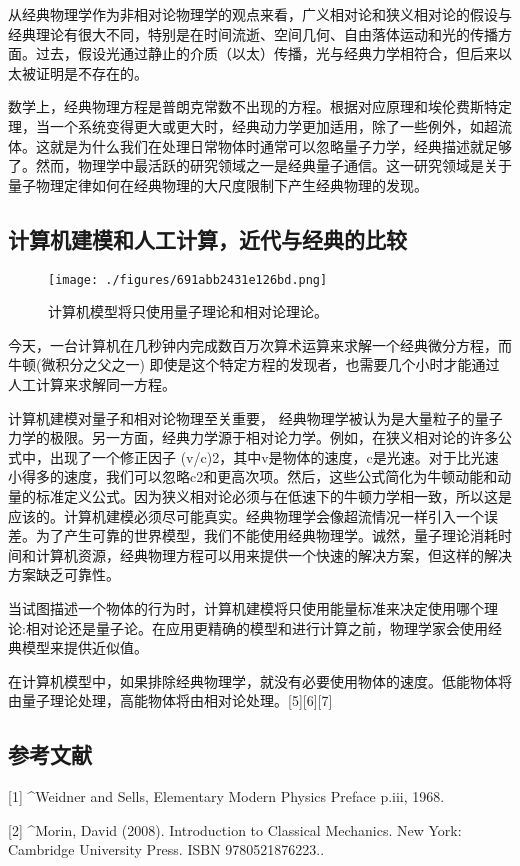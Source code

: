 从经典物理学作为非相对论物理学的观点来看，广义相对论和狭义相对论的假设与经典理论有很大不同，特别是在时间流逝、空间几何、自由落体运动和光的传播方面。过去，假设光通过静止的介质（以太）传播，光与经典力学相符合，但后来以太被证明是不存在的。

数学上，经典物理方程是普朗克常数不出现的方程。根据对应原理和埃伦费斯特定理，当一个系统变得更大或更大时，经典动力学更加适用，除了一些例外，如超流体。这就是为什么我们在处理日常物体时通常可以忽略量子力学，经典描述就足够了。然而，物理学中最活跃的研究领域之一是经典量子通信。这一研究领域是关于量子物理定律如何在经典物理的大尺度限制下产生经典物理的发现。
\subsection{计算机建模和人工计算，近代与经典的比较}
\begin{figure}[ht]
\centering
\texttt{[image: ./figures/691abb2431e126bd.png]}
\caption{计算机模型将只使用量子理论和相对论理论。} \label{fig_JDWLX_1}
\end{figure}
今天，一台计算机在几秒钟内完成数百万次算术运算来求解一个经典微分方程，而牛顿(微积分之父之一) 即使是这个特定方程的发现者，也需要几个小时才能通过人工计算来求解同一方程。

计算机建模对量子和相对论物理至关重要， 经典物理学被认为是大量粒子的量子力学的极限。另一方面，经典力学源于相对论力学。例如，在狭义相对论的许多公式中，出现了一个修正因子 (v/c)2，其中v是物体的速度，c是光速。对于比光速小得多的速度，我们可以忽略c2和更高次项。然后，这些公式简化为牛顿动能和动量的标准定义公式。因为狭义相对论必须与在低速下的牛顿力学相一致，所以这是应该的。计算机建模必须尽可能真实。经典物理学会像超流情况一样引入一个误差。为了产生可靠的世界模型，我们不能使用经典物理学。诚然，量子理论消耗时间和计算机资源，经典物理方程可以用来提供一个快速的解决方案，但这样的解决方案缺乏可靠性。

当试图描述一个物体的行为时，计算机建模将只使用能量标准来决定使用哪个理论:相对论还是量子论。在应用更精确的模型和进行计算之前，物理学家会使用经典模型来提供近似值。

在计算机模型中，如果排除经典物理学，就没有必要使用物体的速度。低能物体将由量子理论处理，高能物体将由相对论处理。[5][6][7]
\subsection{参考文献}[1]
^Weidner and Sells, Elementary Modern Physics Preface p.iii, 1968.

[2]
^Morin, David (2008). Introduction to Classical Mechanics. New York: Cambridge University Press. ISBN 9780521876223..

